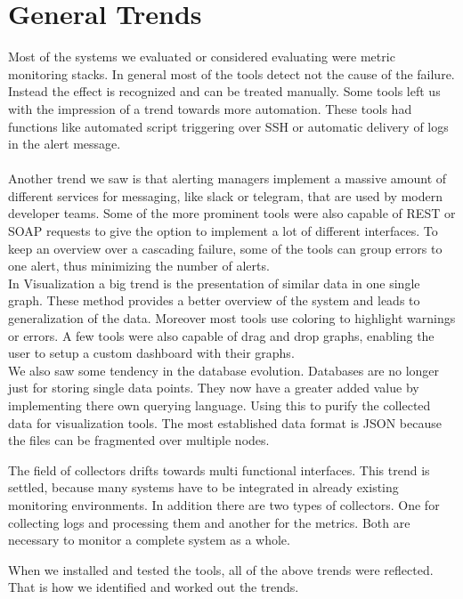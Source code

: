 \section{General Trends}
\label{generaltrends}
Most of the systems we evaluated or considered evaluating were metric monitoring stacks. In general most of the tools detect not the cause of the failure. Instead the effect is recognized and can be treated manually. Some tools left us with the impression of a trend towards more automation. These tools had functions like automated script triggering over SSH or automatic delivery of logs in the alert message. \\
\\
Another trend we saw is that alerting managers implement a massive amount of different services for messaging, like slack or telegram, that are used by modern developer teams. Some of the more prominent tools were also capable of REST or SOAP requests to give the option to implement a lot of different interfaces. To keep an overview over a cascading failure, some of the tools can group errors to one alert, thus minimizing the number of alerts.
\\
In Visualization a big trend is the presentation of similar data in one single graph. These method provides a better overview of the system and leads to generalization of the data. Moreover most tools use coloring to highlight warnings or errors. A few tools were also capable of drag and drop graphs, enabling the user to setup a custom dashboard with their graphs.
\\
We also saw some tendency in the database evolution. Databases are no longer just for storing single data points. They now have a greater added value by implementing there own querying language. Using this to purify the collected data for visualization tools. The most established data format is JSON because the files can be fragmented over multiple nodes.

The field of collectors drifts towards multi functional interfaces. This trend is settled, because many systems have to be integrated in already existing monitoring environments. In addition there are two types of collectors. One for collecting logs and processing them and another for the metrics. Both are necessary to monitor a complete system as a whole.

When we installed and tested the tools, all of the above trends were reflected. That is how we identified and worked out the trends. 

